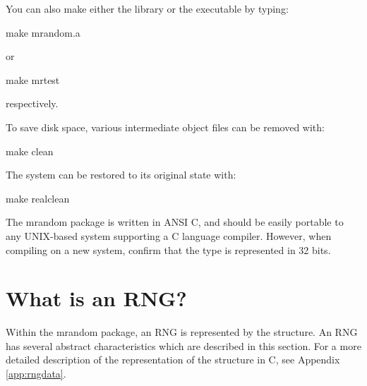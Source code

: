 You can also make either the  library or the 
executable by typing:\\
\begin{example}
make mrandom.a\\
\end{example}
or\\
\begin{example}
make mrtest\\
\end{example}
\noindent
respectively.

To save disk space, various intermediate object files can be removed
with:\\
\begin{example}
make clean\\
\end{example}
The system can be restored to its original state with:\\
\begin{example}
make realclean\\
\end{example}
The mrandom package is written in ANSI C, and should be
easily portable to any UNIX-based system supporting a C language
compiler.  However, when compiling on a new system, confirm that
the  type is represented in 32 bits.

\section{What is an RNG?}

Within the mrandom package, an RNG is represented by the 
structure.  An RNG has several abstract characteristics which are
described in this section.  For a more detailed description of the
representation of the  structure in C, see
Appendix \ref{app:rngdata}.

